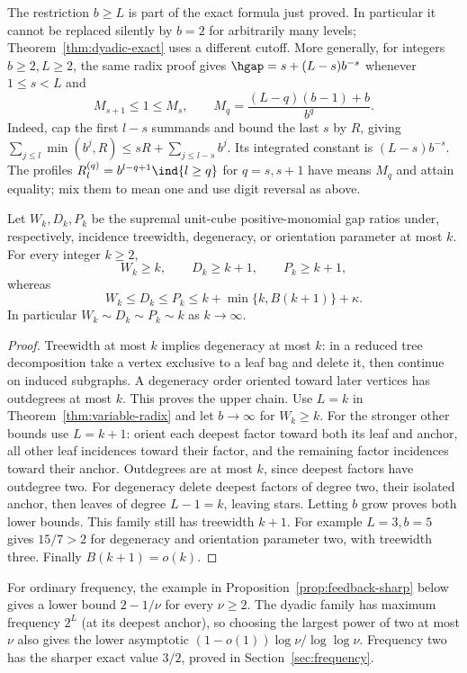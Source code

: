 The restriction $b\ge L$ is part of the exact formula just proved. In
particular it cannot be replaced silently by $b=2$ for arbitrarily many
levels; Theorem~\ref{thm:dyadic-exact} uses a different cutoff. More
generally, for integers $b\ge2,L\ge2$, the same radix proof gives
$\hgap=s+(L-s)b^{-s}$ whenever $1\le s<L$ and
\[
 M_{s+1}\le1\le M_s,\qquad
 M_q=\frac{(L-q)(b-1)+b}{b^q}.
\]
Indeed, cap the first $l-s$ summands and bound the last $s$ by $R$, giving
$\sum_{j\le l}\min(b^j,R)\le sR+\sum_{j\le l-s}b^j$.
Its integrated constant is $(L-s)b^{-s}$. The profiles
$R_l^{(q)}=b^{l-q+1}\ind\{l\ge q\}$ for $q=s,s+1$ have means $M_q$
and attain equality; mix them to mean one and use digit reversal as above.

\begin{corollary}\label{cor:structural-growth}
Let $W_k,D_k,P_k$ be the supremal unit-cube positive-monomial gap ratios
under, respectively, incidence treewidth, degeneracy, or orientation
parameter at most $k$. For every integer $k\ge2$,
\[
 W_k\ge k,\qquad D_k\ge k+1,\qquad P_k\ge k+1,
\]
whereas
\[
 W_k\le D_k\le P_k\le k+\min\{k,B(k+1)\}+\kappa.
\]
In particular $W_k\sim D_k\sim P_k\sim k$ as $k\to\infty$.
\end{corollary}
\begin{proof}
Treewidth at most $k$ implies degeneracy at most $k$: in a reduced tree
decomposition take a vertex exclusive to a leaf bag and delete it,
then continue on induced subgraphs. A degeneracy order oriented toward
later vertices has outdegrees at most $k$. This proves the upper chain.
Use $L=k$ in Theorem~\ref{thm:variable-radix} and let $b\to\infty$ for
$W_k\ge k$. For the stronger other bounds use $L=k+1$: orient each
deepest factor toward both its leaf and anchor, all other leaf incidences
toward their factor, and the remaining factor incidences toward their
anchor. Outdegrees are at most $k$, since deepest factors have outdegree
two. For degeneracy delete deepest factors of degree two, their isolated
anchor, then leaves of degree $L-1=k$, leaving stars. Letting $b$ grow
proves both lower bounds. This family still has treewidth $k+1$.
For example $L=3,b=5$ gives $15/7>2$ for degeneracy and orientation
parameter two, with treewidth three. Finally $B(k+1)=o(k)$.
\end{proof}

For ordinary frequency, the example in Proposition~\ref{prop:feedback-sharp}
below gives a lower bound $2-1/\nu$ for every $\nu\ge2$.
The dyadic family has maximum frequency $2^L$ (at its deepest anchor), so
choosing the largest power of two at most $\nu$ also gives the lower
asymptotic $(1-o(1))\log\nu/\log\log\nu$. Frequency two has the sharper
exact value $3/2$, proved in Section~\ref{sec:frequency}.

